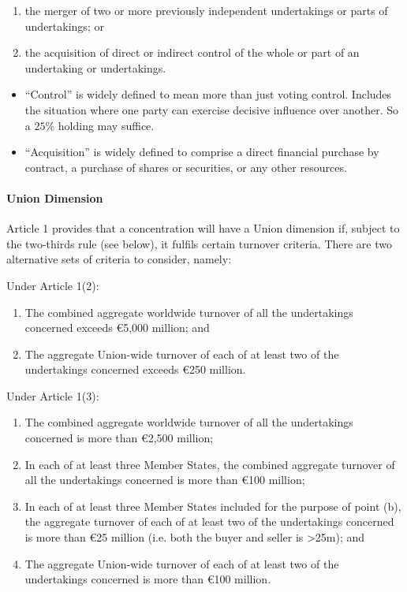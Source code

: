 \documentclass[
]{article}
\providecommand{\tightlist}{%
  \setlength{\itemsep}{0pt}\setlength{\parskip}{0pt}}
\begin{document}
\begin{enumerate}
\tightlist
\item
  the merger of two or more previously independent undertakings or parts
  of undertakings; or
\item
  the acquisition of direct or indirect control of the whole or part of
  an undertaking or undertakings.
\end{enumerate}

\begin{itemize}
\tightlist
\item
  ``Control'' is widely defined to mean more than just voting control.
  Includes the situation where one party can exercise decisive influence
  over another. So a {\(25\%\)} holding may suffice.
\item
  ``Acquisition'' is widely defined to comprise a direct financial
  purchase by contract, a purchase of shares or securities, or any other
  resources.
\end{itemize}

\hypertarget{union-dimension}{%
\paragraph{Union Dimension}\label{union-dimension}}

Article 1 provides that a concentration will have a Union dimension if,
subject to the two-thirds rule (see below), it fulfils certain turnover
criteria. There are two alternative sets of criteria to consider,
namely:

Under Article 1(2):

\begin{enumerate}
\tightlist
\item
  The combined aggregate worldwide turnover of all the undertakings
  concerned exceeds €5,000 million; and
\item
  The aggregate Union-wide turnover of each of at least two of the
  undertakings concerned exceeds €250 million.
\end{enumerate}

Under Article 1(3):

\begin{enumerate}
\tightlist
\item
  The combined aggregate worldwide turnover of all the undertakings
  concerned is more than €2,500 million;
\item
  In each of at least three Member States, the combined aggregate
  turnover of all the undertakings concerned is more than €100 million;
\item
  In each of at least three Member States included for the purpose of
  point (b), the aggregate turnover of each of at least two of the
  undertakings concerned is more than €25 million (i.e. both the buyer
  and seller is \textgreater25m); and
\item
  The aggregate Union-wide turnover of each of at least two of the
  undertakings concerned is more than €100 million.
\end{enumerate}
\end{document}
